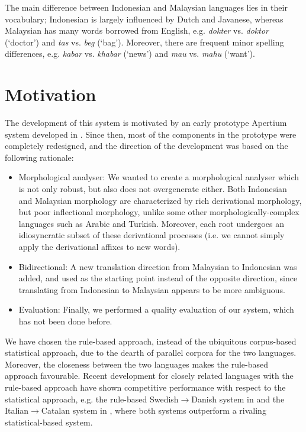 \documentclass[10pt,a5paper,twoside]{article}
\begin{document}
The main difference between Indonesian and Malaysian languages lies in their vocabulary; Indonesian is largely influenced by Dutch and Javanese, whereas Malaysian has many words borrowed from English, e.g. \emph{dokter} vs. \emph{doktor} (`doctor') and \emph{tas} vs. \emph{beg} (`bag'). Moreover, there are frequent minor spelling differences, e.g. \emph{kabar} vs. \emph{khabar} (`news') and \emph{mau} vs. \emph{mahu} (`want').

\section{Motivation}
\label{sec:prev}
The development of this system is motivated by an early prototype Apertium system developed in \citet{larasati2010study}. Since then, most of the components in the prototype were completely redesigned, and the direction of the development was based on the following rationale:
\begin{itemize}
\item{Morphological analyser: We wanted to create a morphological analyser which is not only robust, but also does not overgenerate either. Both Indonesian and Malaysian morphology are characterized by rich derivational morphology, but poor inflectional morphology, unlike some other morphologically-complex languages such as Arabic and Turkish. Moreover, each root undergoes an idiosyncratic subset of these derivational processes (i.e. we cannot simply apply the derivational affixes to new words).}
\item{Bidirectional: A new translation direction from Malaysian to Indonesian was added, and used as the starting point instead of the opposite direction, since translating from Indonesian to Malaysian appears to be more ambiguous.}
\item{Evaluation: Finally, we performed a quality evaluation of our system, which has not been done before.}
\end{itemize}

We have chosen the rule-based approach, instead of the ubiquitous corpus-based statistical approach, due to the dearth of parallel corpora for the two languages. Moreover, the closeness between the two languages makes the rule-based approach favourable. Recent development for closely related languages with the rule-based approach have shown competitive performance with respect to the statistical approach, e.g. the rule-based Swedish$\rightarrow$Danish system in \citet{tyers2009svda} and the Italian$\rightarrow$Catalan system in \citet{tyers2011itca}, where both systems outperform a rivaling statistical-based system.
\end{document}
